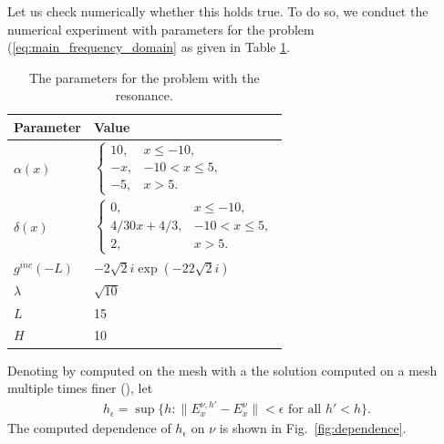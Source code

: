Let us check numerically whether this holds true. 
To do so, we conduct the  numerical experiment with parameters for the problem (\ref{eq:main_frequency_domain} as given in Table \ref{tab:parameters}.
\begin{table}[htb!]
\begin{tabular}{l|l}
Parameter & Value \\
\hline
$\alpha(x)$ & $\left\{\begin{array}{lr}
10, & x\leq -10,\\
-x, & -10<x\leq 5,\\
-5, & x>5.
\end{array}\right.$ \\
$\delta(x)$ & 
$\left\{\begin{array}{lr}
0, & x\leq -10,\\
4/30x+4/3,& -10<x\leq 5,\\
2, & x>5.
\end{array}\right.$ \\
$g^{inc}(-L)$ & $-2 \sqrt{2}i\exp(-22\sqrt{2}i)$\\
$\lambda$ & 
$\sqrt{10}$\\
$L$& 15\\
$H$ & 10 \\
\end{tabular}
\caption{The parameters for the problem with the resonance.}
\label{tab:parameters}
\end{table}
Denoting by  computed on the mesh with a  the solution computed on a mesh multiple times finer (), let 
\begin{align}
\label{eq:def_epsilon}
h_{\epsilon}=\sup\{h: \|E_{x}^{\nu,h'}-E_{x}^{\nu}\|<\epsilon \text{ for all } h'<h\}.
\end{align}
The computed dependence of $h_{\epsilon}$ on $\nu$ is shown in Fig.~\ref{fig:dependence}.
